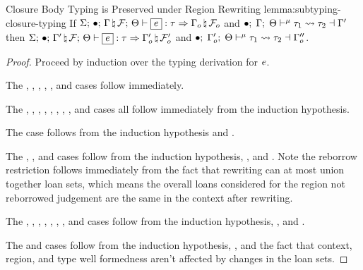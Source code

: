 \begin{oxlemma}{Closure Body Typing is Preserved under Region Rewriting}
  {lemma:subtyping-closure-typing} If
  $\oxtypjudge{\oxglobalctx}{\oxemptyctx}{\oxkontctx}{\oxnewframe{\oxvarctx}{\oxframe}}
  {\oxexpr}{\oxtype}{\oxnewframe{\oxvarctx_o}{\oxframe_o}}$ and
  $\bullet; \; \Gamma; \; \Theta \vdash^{\mu} \tau_1 \leadsto \tau_2 \dashv \Gamma^\prime$
  then
  $\oxtypjudge{\oxglobalctx}{\oxemptyctx}{\oxkontctx}{\oxnewframe{\oxvarctx^\prime}{\oxframe}}
  {\oxexpr}{\oxtype}{\oxnewframe{\oxvarctx_o^\prime}{\oxframe_o^\prime}}$ and
  $\bullet; \; \Gamma_o^\prime; \; \Theta \vdash^{\mu} \tau_1 \leadsto \tau_2 \dashv \Gamma_o^{\prime\prime}$.
\end{oxlemma}
\begin{proof}
  Proceed by induction over the typing derivation for $e$.

  The , , , ,
  , and  cases follow immediately.

  The , , ,
  , , , ,
  , and  cases all follow immediately from the
  induction hypothesis.

  The  case follows from the induction hypothesis and
  .

  The , , and  cases follow from
  the induction hypothesis, , and
  . Note the reborrow restriction follows immediately
  from the fact that rewriting can at most union together loan sets, which means
  the overall loans considered for the region not reborrowed judgement are the
  same in the context after rewriting.

  The , , ,
  , , ,
  , and  cases follow from the induction
  hypothesis, , and
  .

  The  and  cases follow from the
  induction hypothesis, , and the fact that
  context, region, and type well formedness aren't affected by changes in the
  loan sets.
\end{proof}

